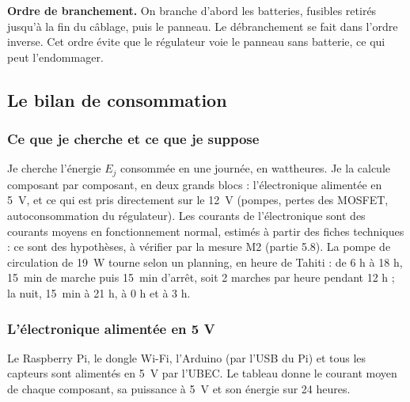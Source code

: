 \textbf{Ordre de branchement.} On branche d'abord les batteries, fusibles retirés jusqu'à la fin du câblage, puis le panneau. Le débranchement se fait dans l'ordre inverse. Cet ordre évite que le régulateur voie le panneau sans batterie, ce qui peut l'endommager.

\subsection{Le bilan de consommation}

\subsubsection*{Ce que je cherche et ce que je suppose}

Je cherche l'énergie $E_j$ consommée en une journée, en wattheures. Je la calcule composant par composant, en deux grands blocs : l'électronique alimentée en \qty{5}{V}, et ce qui est pris directement sur le \qty{12}{V} (pompes, pertes des MOSFET, autoconsommation du régulateur). Les courants de l'électronique sont des courants moyens en fonctionnement normal, estimés à partir des fiches techniques : ce sont des hypothèses, à vérifier par la mesure M2 (partie 5.8). La pompe de circulation de \qty{19}{W} tourne selon un planning, en heure de Tahiti : de 6 h à 18 h, \qty{15}{min} de marche puis \qty{15}{min} d'arrêt, soit 2 marches par heure pendant 12 h ; la nuit, \qty{15}{min} à 21 h, à 0 h et à 3 h.

\subsubsection*{L'électronique alimentée en 5 V}

Le Raspberry Pi, le dongle Wi-Fi, l'Arduino (par l'USB du Pi) et tous les capteurs sont alimentés en \qty{5}{V} par l'UBEC. Le tableau donne le courant moyen de chaque composant, sa puissance à \qty{5}{V} et son énergie sur 24 heures.

